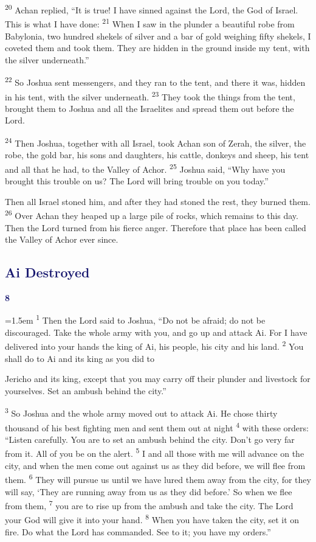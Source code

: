 \documentclass[12pt,twoside]{article}
\newcommand{\vs}[1]{\textsuperscript{#1}}
\newcommand{\chapterWithIndent}[2]{%
  \noindent
  \begin{minipage}[t]{1cm}
    \vspace{-0.4\baselineskip}
    {\textcolor{MidnightBlue}{\fontsize{40pt}{48pt}\selectfont \textbf{#1}}}
  \end{minipage}%
  \hspace{0.3cm}%
  \begin{minipage}[t]{\dimexpr\linewidth - 1.5cm - 0.3cm\relax}
    \hangindent=1.5em
    \hangafter=3
    #2
    \vspace{0.05cm}
  \end{minipage}
}
\begin{document}
\vs{20} Achan replied, ``It is true! I have sinned against the Lord, the God of Israel. This is what I have done:
\vs{21} When I saw in the plunder a beautiful robe from Babylonia, two hundred shekels of silver and a bar of gold weighing fifty shekels, I coveted them and took them. They are hidden in the ground inside my tent, with the silver underneath.''

\vs{22} So Joshua sent messengers, and they ran to the tent, and there it was, hidden in his tent, with the silver underneath.
\vs{23} They took the things from the tent, brought them to Joshua and all the Israelites and spread them out before the Lord.

\vs{24} Then Joshua, together with all Israel, took Achan son of Zerah, the silver, the robe, the gold bar, his sons and daughters, his cattle, donkeys and sheep, his tent and all that he had, to the Valley of Achor.
\vs{25} Joshua said, ``Why have you brought this trouble on us? The Lord will bring trouble on you today.''

Then all Israel stoned him, and after they had stoned the rest, they burned them.
\vs{26} Over Achan they heaped up a large pile of rocks, which remains to this day. Then the Lord turned from his fierce anger. Therefore that place has been called the Valley of Achor ever since.

\subsection*{\textcolor{MidnightBlue}{\textbf{Ai Destroyed}}}

\chapterWithIndent{8}{%
  \vs{1} Then the Lord said to Joshua, ``Do not be afraid; do not be discouraged. Take the whole army with you, and go up and attack Ai. For I have delivered into your hands the king of Ai, his people, his city and his land.
  \vs{2} You shall do to Ai and its king as you did to
}

\noindent Jericho and its king, except that you may carry off their plunder and livestock for yourselves. Set an ambush behind the city.''

\vs{3} So Joshua and the whole army moved out to attack Ai. He chose thirty thousand of his best fighting men and sent them out at night
\vs{4} with these orders: ``Listen carefully. You are to set an ambush behind the city. Don't go very far from it. All of you be on the alert.
\vs{5} I and all those with me will advance on the city, and when the men come out against us as they did before, we will flee from them.
\vs{6} They will pursue us until we have lured them away from the city, for they will say, `They are running away from us as they did before.' So when we flee from them,
\vs{7} you are to rise up from the ambush and take the city. The Lord your God will give it into your hand.
\vs{8} When you have taken the city, set it on fire. Do what the Lord has commanded. See to it; you have my orders.''
\end{document}
